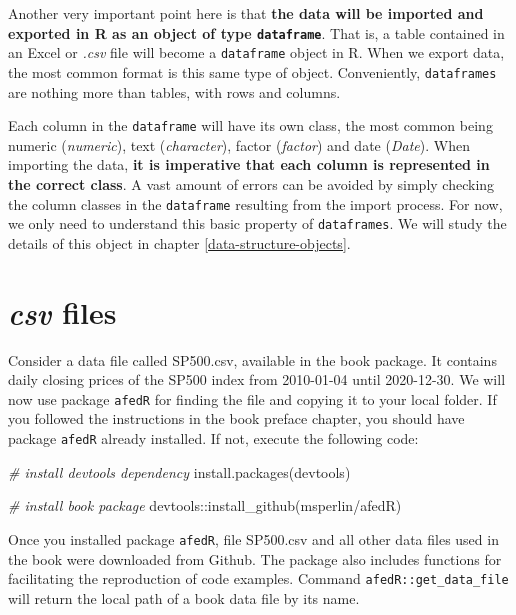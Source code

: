 \documentclass[
  12pt,
]{book}
\newenvironment{Shaded}{\begin{snugshade}}{\end{snugshade}}
\newcommand{\CommentTok}[1]{\textcolor[rgb]{0.37,0.37,0.37}{\textit{#1}}}
\newcommand{\FunctionTok}[1]{\textcolor[rgb]{0,0,0}{#1}}
\newcommand{\NormalTok}[1]{#1}
\newcommand{\SpecialCharTok}[1]{\textcolor[rgb]{0,0,0}{#1}}
\newcommand{\StringTok}[1]{\textcolor[rgb]{0.5,0.5,0.5}{#1}}
\begin{document}
Another very important point here is that \textbf{the data will be imported and exported in R as an object of type \texttt{dataframe}}. That is, a table contained in an Excel or \emph{.csv} file will become a \texttt{dataframe} object in R. When we export data, the most common format is this same type of object. Conveniently, \texttt{dataframes} are nothing more than tables, with rows and columns.

Each column in the \texttt{dataframe} will have its own class, the most common being numeric (\emph{numeric}), text (\emph{character}), factor (\emph{factor}) and date (\emph{Date}). When importing the data, \textbf{it is imperative that each column is represented in the correct class}. A vast amount of errors can be avoided by simply checking the column classes in the \texttt{dataframe} resulting from the import process. For now, we only need to understand this basic property of \texttt{dataframes}. We will study the details of this object in chapter \ref{data-structure-objects}.

\hypertarget{csv-files}{%
\section{\texorpdfstring{\emph{csv} files}{csv files}}\label{csv-files}}

Consider a data file called SP500.csv, available in the book package. It contains daily closing prices of the SP500 index from 2010-01-04 until 2020-12-30. We will now use package \texttt{afedR} for finding the file and copying it to your local folder. If you followed the instructions in the book preface chapter, you should have package \texttt{afedR} already installed. If not, execute the following code: 

\begin{Shaded}
\begin{Highlighting}[]
\CommentTok{\# install devtools dependency}
\FunctionTok{install.packages}\NormalTok{(}\StringTok{\textquotesingle{}devtools\textquotesingle{}}\NormalTok{)}

\CommentTok{\# install book package}
\NormalTok{devtools}\SpecialCharTok{::}\FunctionTok{install\_github}\NormalTok{(}\StringTok{\textquotesingle{}msperlin/afedR\textquotesingle{}}\NormalTok{)}
\end{Highlighting}
\end{Shaded}

Once you installed package \texttt{afedR}, file SP500.csv and all other data files used in the book were downloaded from Github. The package also includes functions for facilitating the reproduction of code examples. Command \texttt{afedR::get\_data\_file} will return the local path of a book data file by its name.
\end{document}
